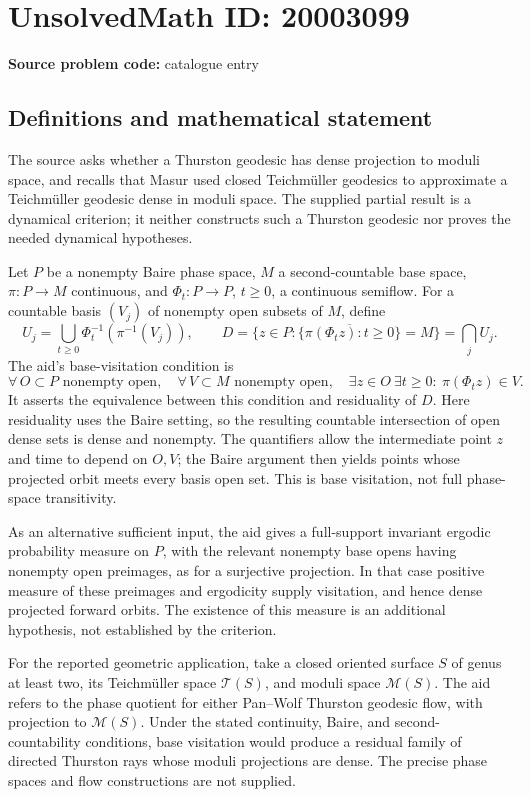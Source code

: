 \documentclass[11pt]{article}
\begin{document}
\section*{UnsolvedMath ID: 20003099}
\textbf{Source problem code:} catalogue entry
\subsection{Definitions and mathematical statement}
The source asks whether a Thurston geodesic has dense projection to moduli space, and recalls that Masur used closed Teichm\"uller geodesics to approximate a Teichm\"uller geodesic dense in moduli space. The supplied partial result is a dynamical criterion; it neither constructs such a Thurston geodesic nor proves the needed dynamical hypotheses.

Let \(P\) be a nonempty Baire phase space, \(M\) a second-countable base space, \(\pi:P\to M\) continuous, and \(\Phi_t:P\to P\), \(t\geq0\), a continuous semiflow. For a countable basis \((V_j)\) of nonempty open subsets of \(M\), define
\[
 U_j=\bigcup_{t\geq0}\Phi_t^{-1}(\pi^{-1}(V_j)),\qquad
 D=\{z\in P:\overline{\{\pi(\Phi_tz):t\geq0\}}=M\}
   =\bigcap_jU_j.
\]
The aid's base-visitation condition is
\[
 \forall\,O\subset P\text{ nonempty open},\quad
 \forall\,V\subset M\text{ nonempty open},\quad
 \exists z\in O\ \exists t\geq0:\ \pi(\Phi_tz)\in V.
\]
It asserts the equivalence between this condition and residuality of \(D\). Here residuality uses the Baire setting, so the resulting countable intersection of open dense sets is dense and nonempty. The quantifiers allow the intermediate point \(z\) and time to depend on \(O,V\); the Baire argument then yields points whose projected orbit meets every basis open set. This is base visitation, not full phase-space transitivity.

As an alternative sufficient input, the aid gives a full-support invariant ergodic probability measure on \(P\), with the relevant nonempty base opens having nonempty open preimages, as for a surjective projection. In that case positive measure of these preimages and ergodicity supply visitation, and hence dense projected forward orbits. The existence of this measure is an additional hypothesis, not established by the criterion.

For the reported geometric application, take a closed oriented surface \(S\) of genus at least two, its Teichm\"uller space \(\mathcal T(S)\), and moduli space \(\mathcal M(S)\). The aid refers to the phase quotient for either Pan--Wolf Thurston geodesic flow, with projection to \(\mathcal M(S)\). Under the stated continuity, Baire, and second-countability conditions, base visitation would produce a residual family of directed Thurston rays whose moduli projections are dense. The precise phase spaces and flow constructions are not supplied.
\end{document}
